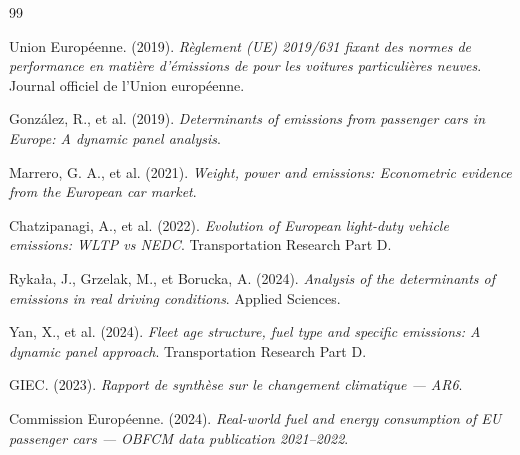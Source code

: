 \documentclass[12pt, a4paper]{article}
\begin{document}
\newpage
\begin{thebibliography}{99}

Union Européenne. (2019). \textit{Règlement (UE) 2019/631 fixant des normes de performance en matière d'émissions de  pour les voitures particulières neuves}. Journal officiel de l'Union européenne.

González, R., et al. (2019). \textit{Determinants of  emissions from passenger cars in Europe: A dynamic panel analysis}.

Marrero, G. A., et al. (2021). \textit{Weight, power and emissions: Econometric evidence from the European car market}.

Chatzipanagi, A., et al. (2022). \textit{Evolution of European light-duty vehicle  emissions: WLTP vs NEDC}. Transportation Research Part D.

Rykała, J., Grzelak, M., et Borucka, A. (2024). \textit{Analysis of the determinants of  emissions in real driving conditions}. Applied Sciences.

Yan, X., et al. (2024). \textit{Fleet age structure, fuel type and specific emissions: A dynamic panel approach}. Transportation Research Part D.

GIEC. (2023). \textit{Rapport de synthèse sur le changement climatique --- AR6}.

Commission Européenne. (2024). \textit{Real-world fuel and energy consumption of EU passenger cars --- OBFCM data publication 2021--2022}.

\end{thebibliography}
\end{document}
